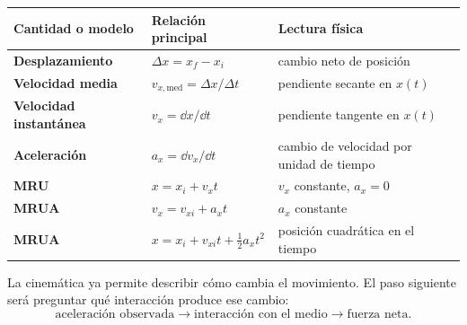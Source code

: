 \documentclass[11pt]{article}
\begin{document}
\begin{center}
\begin{tabularx}{\textwidth}{>{\bfseries}l X X}
\toprule
Cantidad o modelo & Relación principal & Lectura física \\
\midrule
Desplazamiento
& \(\Delta x=x_f-x_i\)
& cambio neto de posición \\
Velocidad media
& \(v_{x,\mathrm{med}}=\Delta x/\Delta t\)
& pendiente secante en \(x(t)\) \\
Velocidad instantánea
& \(v_x=\dd x/\dd t\)
& pendiente tangente en \(x(t)\) \\
Aceleración
& \(a_x=\dd v_x/\dd t\)
& cambio de velocidad por unidad de tiempo \\
MRU
& \(x=x_i+v_xt\)
& \(v_x\) constante, \(a_x=0\) \\
MRUA
& \(v_x=v_{xi}+a_xt\)
& \(a_x\) constante \\
MRUA
& \(x=x_i+v_{xi}t+\tfrac12a_xt^2\)
& posición cuadrática en el tiempo \\
\bottomrule
\end{tabularx}
\end{center}

La cinemática ya permite describir cómo cambia el movimiento. El paso siguiente
será preguntar qué interacción produce ese cambio:
\[
  \text{aceleración observada}
  \longrightarrow
  \text{interacción con el medio}
  \longrightarrow
  \text{fuerza neta}.
\]
\end{document}
